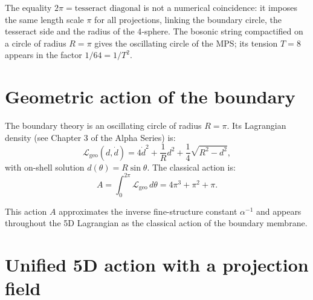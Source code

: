 \documentclass[12pt]{article}
\begin{document}
The equality \(2\pi = \text{tesseract diagonal}\) is not a numerical coincidence: it imposes the same length scale \(\pi\) for all projections, linking the boundary circle, the tesseract side and the radius of the 4‑sphere. The bosonic string compactified on a circle of radius \(R=\pi\) gives the oscillating circle of the MPS; its tension \(T=8\) appears in the factor \(1/64 = 1/T^{2}\).

\section{Geometric action of the boundary}

The boundary theory is an oscillating circle of radius \(R=\pi\). Its Lagrangian density (see Chapter 3 of the Alpha Series) is:
\begin{equation}\label{eq:Lgeo}
\mathcal{L}_{\text{geo}}(d,\dot{d}) = 4\dot{d}^2 + \frac{1}{R}d^2 + \frac{1}{4}\sqrt{R^2-d^2},
\end{equation}
with on-shell solution \(d(\theta)=R\sin\theta\). The classical action is:
\begin{equation}\label{eq:A}
A = \int_0^{2\pi} \mathcal{L}_{\text{geo}}\,d\theta = 4\pi^3 + \pi^2 + \pi.
\end{equation}

This action \(A\) approximates the inverse fine-structure constant \(\alpha^{-1}\) and appears throughout the 5D Lagrangian as the classical action of the boundary membrane.

\section{Unified 5D action with a projection field}
\end{document}

